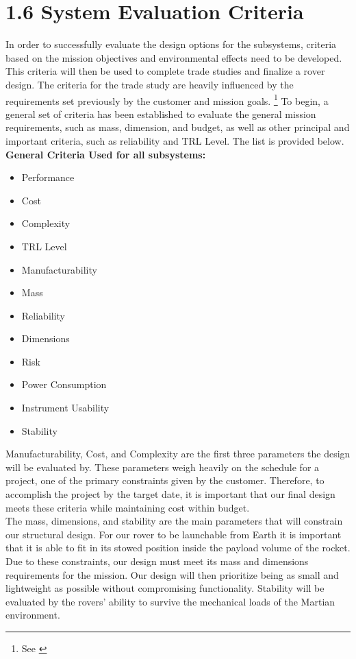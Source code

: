 \section*{1.6 System Evaluation Criteria}

In order to successfully evaluate the design options for the subsystems, criteria based on the mission objectives and environmental effects need to be developed. This criteria will then be used to complete trade studies and finalize a rover design. The criteria for the trade study are heavily influenced by the requirements set previously by the customer and mission goals. \footnote{See \cite{lspace2025mission}} To begin, a general set of criteria has been established to evaluate the general mission requirements, such as mass, dimension, and budget, as well as other principal and important criteria, such as reliability and TRL Level. The list is provided below.\\

\textbf{General Criteria Used for all subsystems:}
\begin{itemize}
    \item Performance 
    \item Cost 
    \item Complexity 
    \item TRL Level 
    \item Manufacturability 
    \item Mass 
    \item Reliability 
    \item Dimensions 
    \item Risk
    \item Power Consumption 
    \item Instrument Usability 
    \item Stability 

\end{itemize}
Manufacturability, Cost, and Complexity are the first three parameters the design will be evaluated by. These parameters weigh heavily on the schedule for a project, one of the primary constraints given by the customer. Therefore, to accomplish the project by the target date, it is important that our final design meets these criteria while maintaining cost within budget.\\

The mass, dimensions, and stability are the main parameters that will constrain our structural design. For our rover to be launchable from Earth it is important that it is able to fit in its stowed position inside the payload volume of the rocket. Due to these constraints, our design must meet its mass and dimensions requirements for the mission. Our design will then prioritize being as small and lightweight as possible without compromising functionality. Stability will be evaluated by the rovers' ability to survive the mechanical loads of the Martian environment.\\


